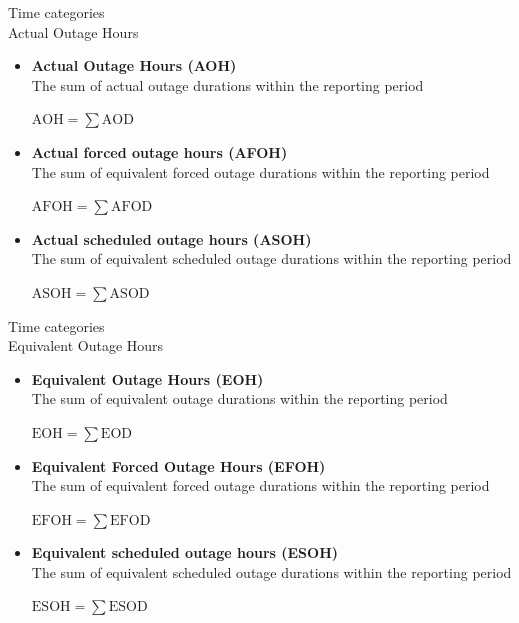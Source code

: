 \begin{frame}{Time categories\\Actual Outage Hours}
  \begin{itemize}
    \item \textbf{Actual Outage Hours (AOH)} \\
    The sum of actual outage durations within the reporting period

    {\centering $\displaystyle \mathrm{AOH}=\sum \mathrm{AOD}$ \par}

    \item \textbf{Actual forced outage hours (AFOH)} \\
    The sum of equivalent forced outage durations within the reporting period

    {\centering $\displaystyle \mathrm{AFOH}=\sum \mathrm{AFOD}$ \par}

    \item \textbf{Actual scheduled outage hours (ASOH)} \\
    The sum of equivalent scheduled outage durations within the reporting period

    {\centering $\displaystyle \mathrm{ASOH}=\sum \mathrm{ASOD}$ \par}


  \end{itemize}
\end{frame}


\begin{frame}{Time categories\\Equivalent Outage Hours}
  \begin{itemize}
    \item \textbf{Equivalent Outage Hours (EOH)} \\
    The sum of equivalent outage durations within the reporting period

    {\centering $\displaystyle \mathrm{EOH}=\sum \mathrm{EOD}$ \par}

    \item \textbf{Equivalent Forced Outage Hours (EFOH)} \\
    The sum of equivalent forced outage durations within the reporting period

    {\centering $\displaystyle \mathrm{EFOH}=\sum \mathrm{EFOD}$ \par}

    \item \textbf{Equivalent scheduled outage hours (ESOH)} \\
    The sum of equivalent scheduled outage durations within the reporting period

    {\centering $\displaystyle \mathrm{ESOH}=\sum \mathrm{ESOD}$ \par}


  \end{itemize}
\end{frame}


